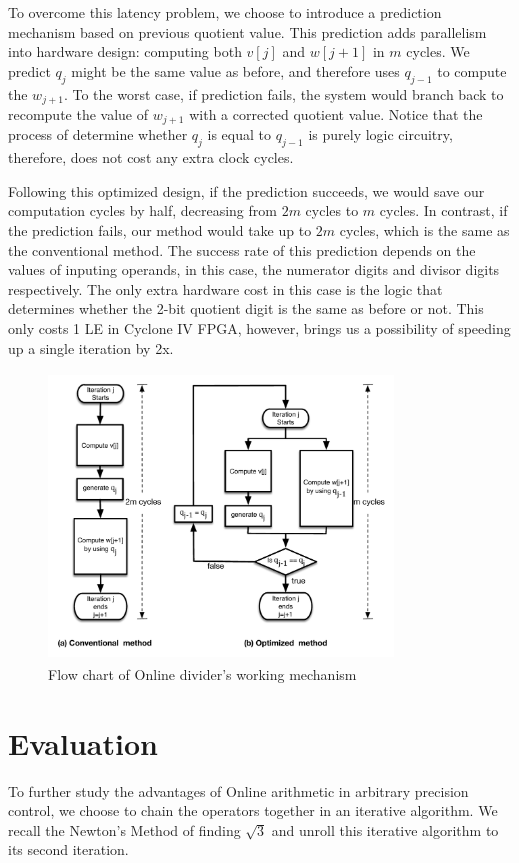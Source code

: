 \documentclass{sig-alternate}
\begin{document}
  To overcome this latency problem, we choose to introduce a prediction mechanism based on previous quotient value. This prediction adds parallelism into hardware design: computing both $v[j]$ and $w[j+1]$ in $m$ cycles. We predict $q_{j}$ might be the same value as before, and therefore uses $q_{j-1}$ to compute the $w_{j+1}$. To the worst case, if prediction fails, the system would branch back to recompute the value of $w_{j+1}$ with a corrected quotient value. Notice that the process of determine whether $q_{j}$ is equal to $q_{j-1}$ is purely logic circuitry, therefore, does not cost any extra clock cycles. 
    
  Following this optimized design, if the prediction succeeds, we would save our computation cycles by half, decreasing from $2m$ cycles to $m$ cycles. In contrast, if the prediction fails, our method would take up to $2m$ cycles, which is the same as the conventional method. The success rate of this prediction depends on the values of inputing operands, in this case, the numerator digits and divisor digits respectively. The only extra hardware cost in this case is the logic that determines whether the 2-bit quotient digit is the same as before or not. This only costs 1 LE in Cyclone IV FPGA, however, brings us a possibility of speeding up a single iteration by 2x.
  \vspace{-10pt} 
  	\begin{figure} [ht]
  		\centering
  		\includegraphics[height=3in,width=3.6in]{flowchart}
  		\caption{Flow chart of Online divider's working mechanism}
  	\end{figure}
  \vspace{-10pt}
  \section{Evaluation}   
  To further study the advantages of Online arithmetic in arbitrary precision control, we choose to chain the operators together in an iterative algorithm. We recall the Newton's Method of finding $\sqrt{3}$ and unroll this iterative algorithm to its second iteration.
    
\end{document}

